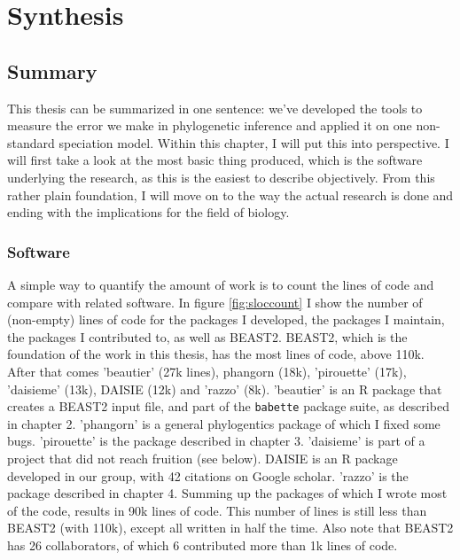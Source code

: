 \chapter{Synthesis}
\label{synthesis}
\newpage

\noindent

\section{Summary}

This thesis can be summarized in one sentence:
we've developed the tools to measure the
error we make in phylogenetic inference and
applied it on one non-standard speciation model.
Within this chapter, I will put this into perspective.
I will first take a look at the most basic thing produced,
which is the software underlying the research,
as this is the easiest to describe objectively. 
From this rather plain foundation, I will move on 
to the way the actual research is done and ending
with the implications for the field of biology.

\subsection{Software}

A simple way to quantify the amount of work
is to count the lines of code and compare with related
software. In figure \ref{fig:sloccount} I show the number of
(non-empty) lines of code for the packages I developed, the packages
I maintain, the packages I contributed to, as well as BEAST2.
BEAST2, which is the foundation of the work in this thesis, 
has the most lines of code, above 110k. After that comes
'beautier' (27k lines), phangorn (18k), 'pirouette' (17k), 'daisieme' (13k), 
DAISIE (12k) and 'razzo' (8k). 
'beautier' is an R package that creates a BEAST2 
input file, and part of the \verb;babette; package suite, as described
in chapter 2. 
'phangorn' is a general phylogentics package of which I fixed some bugs.
'pirouette' is the package described in chapter 3. 
'daisieme' is part of a project that did not reach fruition (see below).
DAISIE is an R package developed in our group, with 42 citations on
Google scholar. 'razzo' is the package described in chapter 4.
Summing up the packages of which I wrote most of the code, results
in 90k lines of code. This number of lines is still less than 
BEAST2 (with 110k), except all written in half the time. Also note that
BEAST2 has 26 collaborators, of which 6 contributed more than 1k lines of code.

